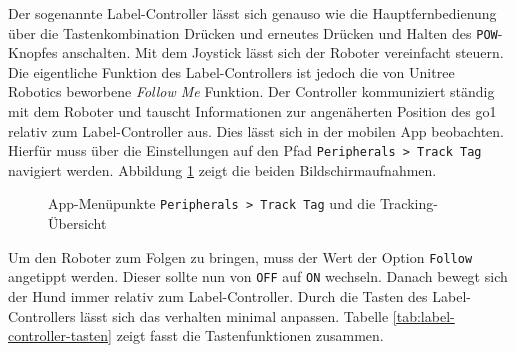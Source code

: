 Der sogenannte Label-Controller lässt sich genauso wie die Hauptfernbedienung über die Tastenkombination Drücken und
erneutes Drücken und Halten des \texttt{POW}-Knopfes anschalten.
Mit dem Joystick lässt sich der Roboter vereinfacht steuern.
Die eigentliche Funktion des Label-Controllers ist jedoch die von Unitree Robotics beworbene \emph{Follow Me} Funktion.
Der Controller kommuniziert ständig mit dem Roboter und tauscht Informationen zur angenäherten Position des \gls{go1} relativ
zum Label-Controller aus.
Dies lässt sich in der mobilen App beobachten.
Hierfür muss über die Einstellungen auf den Pfad \texttt{Peripherals > Track Tag} navigiert werden.
Abbildung \ref{fig:follow-me} zeigt die beiden Bildschirmaufnahmen.

\begin{figure}[h]
    \caption{App-Menüpunkte \texttt{Peripherals > Track Tag} und die Tracking-Übersicht}\label{fig:follow-me}
\end{figure}

Um den Roboter zum Folgen zu bringen, muss der Wert der Option \texttt{Follow} angetippt werden.
Dieser sollte nun von \texttt{OFF} auf \texttt{ON} wechseln.
Danach bewegt sich der Hund immer relativ zum Label-Controller.
Durch die Tasten des Label-Controllers lässt sich das verhalten minimal anpassen.
Tabelle \ref{tab:label-controller-tasten} zeigt fasst die Tastenfunktionen zusammen.

